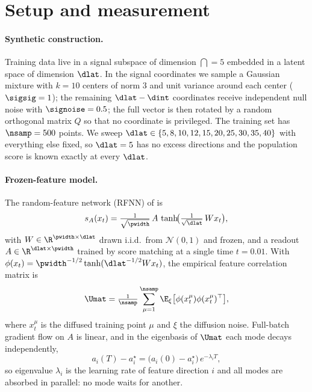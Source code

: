 \section{Setup and measurement}
\label{sec:setup}\label{sec:design}

\paragraph{Synthetic construction.}
Training data live in a signal subspace of dimension $\dint=5$ embedded in a latent space of dimension $\dlat$. In the signal coordinates we sample a Gaussian mixture with $k=10$ centers of norm $3$ and unit variance around each center ($\sigsig=1$); the remaining $\dlat-\dint$ coordinates receive independent null noise with $\signoise=0.5$; the full vector is then rotated by a random orthogonal matrix $Q$ so that no coordinate is privileged. The training set has $\nsamp=500$ points. We sweep $\dlat\in\{5,8,10,12,15,20,25,30,35,40\}$ with everything else fixed, so $\dlat=5$ has no excess directions and the population score is known exactly at every $\dlat$.

\paragraph{Frozen-feature model.}
The random-feature network (RFNN) of \citet{bonnaire2025} is
\begin{equation}
  s_A(x_t)=\tfrac{1}{\sqrt{\pwidth}}\,A\,\tanh\!\bigl(\tfrac{1}{\sqrt{\dlat}}\,Wx_t\bigr),
  \label{eq:rfnn}
\end{equation}
with $W\in\R^{\pwidth\times\dlat}$ drawn i.i.d.\ from $\mathcal N(0,1)$ and frozen, and a readout $A\in\R^{\dlat\times\pwidth}$ trained by score matching at a single time $t=0.01$. With $\phi(x_t)=\pwidth^{-1/2}\tanh(\dlat^{-1/2}Wx_t)$, the empirical feature correlation matrix is
\begin{equation}
  \Umat=\tfrac{1}{\nsamp}\sum_{\mu=1}^{\nsamp}\E_\xi\bigl[\phi(x_t^\mu)\phi(x_t^\mu)^\top\bigr],
  \label{eq:U}
\end{equation}
where $x_t^\mu$ is the diffused training point $\mu$ and $\xi$ the diffusion noise. Full-batch gradient flow on $A$ is linear, and in the eigenbasis of $\Umat$ each mode decays independently,
\begin{equation}
  a_i(T)-a_i^\star=\bigl(a_i(0)-a_i^\star\bigr)\,e^{-\lambda_i T},
  \label{eq:rfnn-gradflow}
\end{equation}
so eigenvalue $\lambda_i$ is the learning rate of feature direction $i$ and all modes are absorbed in parallel: no mode waits for another.


